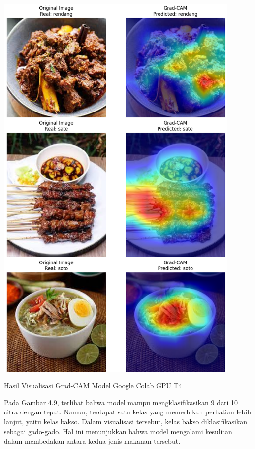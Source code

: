 \begin{afigure}
    \includegraphics[width=0.9\textwidth, center]{images/grad-cam-3.png}
    \caption{Hasil Visualisasi Grad-CAM Model Google Colab GPU T4}
    \label{fig:grad-cam-3}
\end{afigure}

\clearpage

Pada Gambar 4.9, terlihat bahwa model mampu mengklasifikasikan 9 dari 10 citra dengan tepat. Namun, terdapat satu kelas yang memerlukan perhatian lebih lanjut, yaitu kelas bakso. Dalam visualisasi tersebut, kelas bakso diklasifikasikan sebagai gado-gado. Hal ini menunjukkan bahwa model mengalami kesulitan dalam membedakan antara kedua jenis makanan tersebut.

